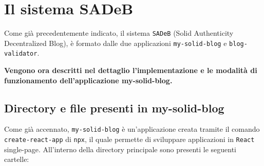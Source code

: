 
\chapter{Il sistema SADeB}

\medskip

Come già precedentemente indicato, il sistema {\tt SADeB} (Solid Authenticity Decentralized Blog), è formato dalle due applicazioni {\tt my-solid-blog} e {\tt blog-validator}.

\bigskip

\textbf{Vengono ora descritti nel dettaglio l'implementazione e le modalità di funzionamento dell'applicazione my-solid-blog.}

\bigskip

\section{Directory e file presenti in my-solid-blog}

\medskip


Come già accennato, {\tt my-solid-blog} è un'applicazione creata tramite il comando\\{\tt create-react-app} di {\tt npx}, il quale permette di sviluppare applicazioni in {\tt React} single-page. All'interno della directory principale sono presenti le seguenti cartelle:

\medskip

